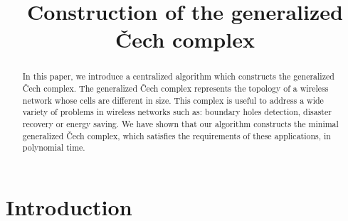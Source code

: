 \documentclass[conference]{IEEEtran}
\begin{document}
\title{Construction of the generalized \v{C}ech complex}


\author
{
}

\maketitle


\begin{abstract}
In this paper, we introduce a centralized algorithm which constructs the generalized \v{C}ech complex. The generalized \v{C}ech complex represents the topology of a wireless network whose cells are different in size. This complex is useful to address a wide variety of problems in wireless networks such as: boundary holes detection, disaster recovery or energy saving. We have shown that our algorithm constructs the minimal generalized \v{C}ech complex, which satisfies the requirements of these applications, in polynomial time.




\end{abstract}







\IEEEpeerreviewmaketitle



\section{Introduction}
\end{document}
